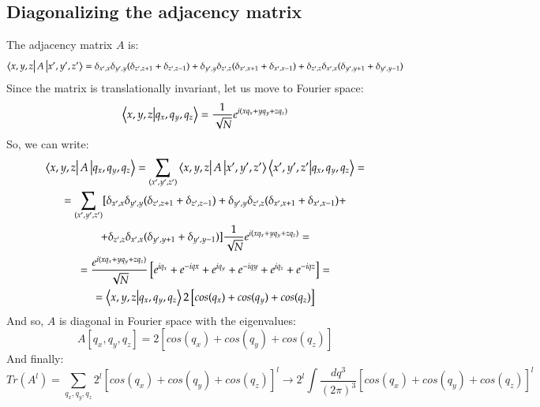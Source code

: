\documentclass{article}
\begin{document}
\subsection{Diagonalizing the adjacency matrix}
The adjacency matrix $A$ is:
\begin{equation}
    \bra{x, y, z}A\ket{x', y', z'} = \delta_{x',x}\delta_{y',y}(\delta_{z',z+1} + \delta_{z',z-1}) + \delta_{y',y}\delta_{z',z}(\delta_{x',x+1} + \delta_{x',x-1}) + \delta_{z',z}\delta_{x',x}(\delta_{y',y+1} + \delta_{y',y-1})
\end{equation}
Since the matrix is translationally invariant, let us move to Fourier space:
\begin{equation}
    \braket{x,y,z}{q_x,q_y,q_z} = \frac{1}{\sqrt{N}}e^{i(xq_x + yq_y + zq_z)}
\end{equation}
So, we can write:
\begin{equation}
\begin{gathered}
    \bra{x,y,z}A\ket{q_x,q_y,q_z} = 
    \sum_{(x',y',z')}\bra{x,y,z}A\ket{x',y',z'}\bra{x',y',z'}\ket{q_x,q_y,q_z} = \\ =
    \sum_{(x',y',z')} [\delta_{x',x}\delta_{y',y}(\delta_{z',z+1} + \delta_{z',z-1}) + \delta_{y',y}\delta_{z',z}(\delta_{x',x+1} + \delta_{x',x-1}) + \\ + \delta_{z',z}\delta_{x',x}(\delta_{y',y+1} + \delta_{y',y-1})]\frac{1}{\sqrt{N}}e^{i(xq_x + yq_y + zq_z)} = \\ =
    \frac{e^{i(xq_x + yq_y + zq_z)}}{\sqrt{N}}\left[
        e^{iq_x} + e^{-iqx} + e^{iq_y} + e^{-iqy} + e^{iq_z} + e^{-iqz}
    \right] = \\ =
    \braket{x,y,z}{q_x,q_y,q_z}2\left[cos(q_x) + cos(q_y) + cos(q_z)\right]
\end{gathered}
\end{equation}
And so, $A$ is diagonal in Fourier space with the eigenvalues:
\begin{equation}
    A[q_x,q_y,q_z] = 2\left[cos(q_x) + cos(q_y) + cos(q_z)\right]
\end{equation}
And finally:
\begin{equation}
    Tr(A^l) = \sum_{q_x, q_y, q_z} 2^l \left[cos(q_x) + cos(q_y) + cos(q_z)\right]^l \rightarrow 2^l \int \frac{dq^3}{(2\pi)^3}\left[cos(q_x) + cos(q_y) + cos(q_z)\right]^l
\end{equation}
\end{document}
